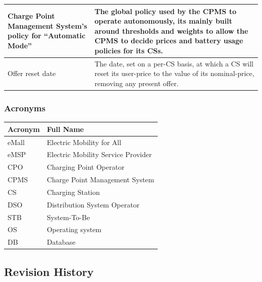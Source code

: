 \documentclass[11pt]{article}
\begin{document}
\begin{table}[H]
\begin{tabularx}{\textwidth}{|>{\centering\hsize=0.4\hsize}X|>{\hsize=1.6\hsize}X|}
        \hline
        Charge Point Management System's policy for “Automatic Mode” & The global policy used by the CPMS to operate autonomously, its mainly built around thresholds and weights to allow the CPMS to decide prices and battery usage policies for its CSs. \\
        \hline
        Offer reset date & The date, set on a per-CS basis, at which a CS will reset its user-price to the value of its nominal-price, removing any present offer. \\
        \hline
    \end{tabularx}
    \label{tab:definitions}
\end{table}

\subsubsection{Acronyms}

\begin{table}[H]
    \centering
    \setlength{\tabcolsep}{18pt}
    \renewcommand{\arraystretch}{1.2}
    \begin{tabularx}{\textwidth}{|>{\centering\hsize=0.3\hsize}X|>{\hsize=1.7\hsize}X|}
        \hline
        \textbf{Acronym} & \textbf{Full Name} \\
        \hline
        eMall & Electric Mobility for All \\
        \hline
        eMSP & Electric Mobility Service Provider \\
        \hline
        CPO & Charging Point Operator \\
        \hline
        CPMS & Charge Point Management System \\
        \hline
        CS & Charging Station \\
        \hline
        DSO & Distribution System Operator \\
        \hline
        STB & System-To-Be \\
        \hline
        OS & Operating system \\
        \hline
        DB & Database \\
        \hline
    \end{tabularx}
    \label{tab:acronyms}
\end{table}

\subsection{Revision History}
\end{document}
